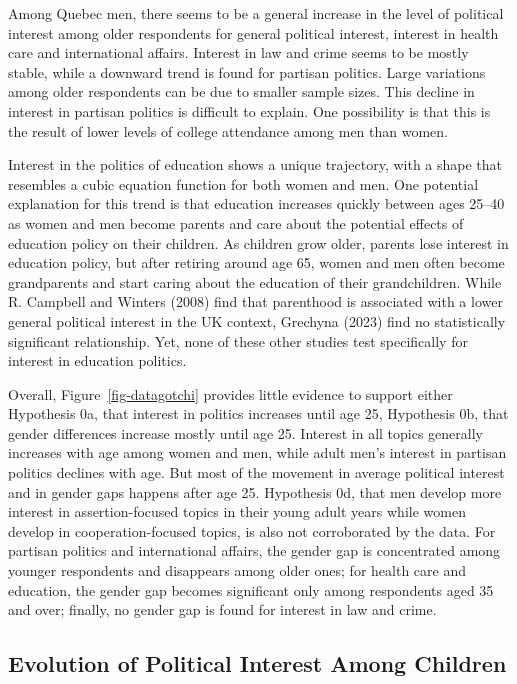 \documentclass[
  letterpaper,
  DIV=11,
  numbers=noendperiod]{scrreprt}
\begin{document}
Among Quebec men, there seems to be a general increase in the level of
political interest among older respondents for general political
interest, interest in health care and international affairs. Interest in
law and crime seems to be mostly stable, while a downward trend is found
for partisan politics. Large variations among older respondents can be
due to smaller sample sizes. This decline in interest in partisan
politics is difficult to explain. One possibility is that this is the
result of lower levels of college attendance among men than women.

Interest in the politics of education shows a unique trajectory, with a
shape that resembles a cubic equation function for both women and men.
One potential explanation for this trend is that education increases
quickly between ages 25--40 as women and men become parents and care
about the potential effects of education policy on their children. As
children grow older, parents lose interest in education policy, but
after retiring around age 65, women and men often become grandparents
and start caring about the education of their grandchildren. While R.
Campbell and Winters (2008) find that parenthood is associated with a
lower general political interest in the UK context, Grechyna (2023) find
no statistically significant relationship. Yet, none of these other
studies test specifically for interest in education politics.

Overall, Figure~\ref{fig-datagotchi} provides little evidence to support
either Hypothesis 0a, that interest in politics increases until age 25,
Hypothesis 0b, that gender differences increase mostly until age 25.
Interest in all topics generally increases with age among women and men,
while adult men's interest in partisan politics declines with age. But
most of the movement in average political interest and in gender gaps
happens after age 25. Hypothesis 0d, that men develop more interest in
assertion-focused topics in their young adult years while women develop
in cooperation-focused topics, is also not corroborated by the data. For
partisan politics and international affairs, the gender gap is
concentrated among younger respondents and disappears among older ones;
for health care and education, the gender gap becomes significant only
among respondents aged 35 and over; finally, no gender gap is found for
interest in law and crime.

\subsection{Evolution of Political Interest Among
Children}\label{evolution-of-political-interest-among-children}
\end{document}
